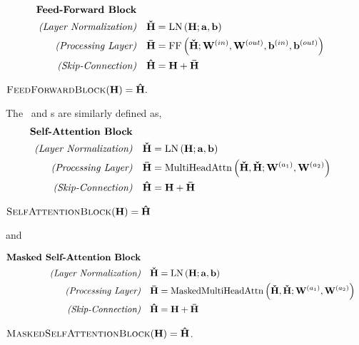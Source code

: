    \begin{align*}
       \textbf{Feed-Forward Block} & \\
       \textit{(Layer Normalization)} & & 
            \boldsymbol{\check{\mathbf{H}}} &
            =  \operatorname{LN}\left(\mathbf{H}; \mathbf{a}, \mathbf{b} \right) \\
            \textit{(Processing Layer)} &  & \boldsymbol{\bar{\mathbf{H}}} &= \operatorname{FF}\left(\boldsymbol{\check{\mathbf{H}}};\mathbf{W}^{(in)},\mathbf{W}^{(out)},\mathbf{b}^{(in)},\mathbf{b}^{(out)}\right)\\
        \textit{(Skip-Connection)} & & \boldsymbol{\hat{\mathbf{H}}} &= \mathbf{H} + \boldsymbol{\bar{\mathbf{H}}}\end{align*}
        \begin{center}$\textsc{FeedForwardBlock}(\mathbf{H})  =   \boldsymbol{\hat{\mathbf{H}}}.$ \end{center}

\noindent   The \selfattentionblock~and \maskedselfattentionblock s are similarly defined as,
   \begin{align*}
       \textbf{Self-Attention Block} & \\
       \textit{(Layer Normalization)} & & 
            \boldsymbol{\check{\mathbf{H}}} &
            =  \operatorname{LN}\left(\mathbf{H}; \mathbf{a}, \mathbf{b} \right) \\
            \textit{(Processing Layer)} &  & \boldsymbol{\bar{\mathbf{H}}} &=  \operatorname{MultiHeadAttn}\left(\boldsymbol{\check{\mathbf{H}}}, \boldsymbol{\check{\mathbf{H}}}; \mathbf{W}^{(a_1)},  \mathbf{W}^{(a_2)}\right)  \\
        \textit{(Skip-Connection)} & & \boldsymbol{\hat{\mathbf{H}}} &= \mathbf{H} + \boldsymbol{\bar{\mathbf{H}}}\end{align*}
       \begin{center}  {$\textsc{SelfAttentionBlock}(\mathbf{H}) =  {\boldsymbol{\hat{\mathbf{H}}}}$}\end{center}

         \noindent  and 

         \begin{align*}
       \textbf{Masked Self-Attention Block} & \\
       \textit{(Layer Normalization)} & & 
            \boldsymbol{\check{\mathbf{H}}} &
            =  \operatorname{LN}\left(\mathbf{H}; \mathbf{a}, \mathbf{b} \right) \\
            \textit{(Processing Layer)} &  & \boldsymbol{\bar{\mathbf{H}}} &=  \operatorname{MaskedMultiHeadAttn}\left(\boldsymbol{\check{\mathbf{H}}}, \boldsymbol{\check{\mathbf{H}}}; \mathbf{W}^{(a_1)},  \mathbf{W}^{(a_2)}\right)  \\
        \textit{(Skip-Connection)} & & \boldsymbol{\hat{\mathbf{H}}} &= \mathbf{H} + \boldsymbol{\bar{\mathbf{H}}}\end{align*}
       \begin{center}  {$\textsc{MaskedSelfAttentionBlock}(\mathbf{H}) =  {\boldsymbol{\hat{\mathbf{H}}}}$.}\end{center}

